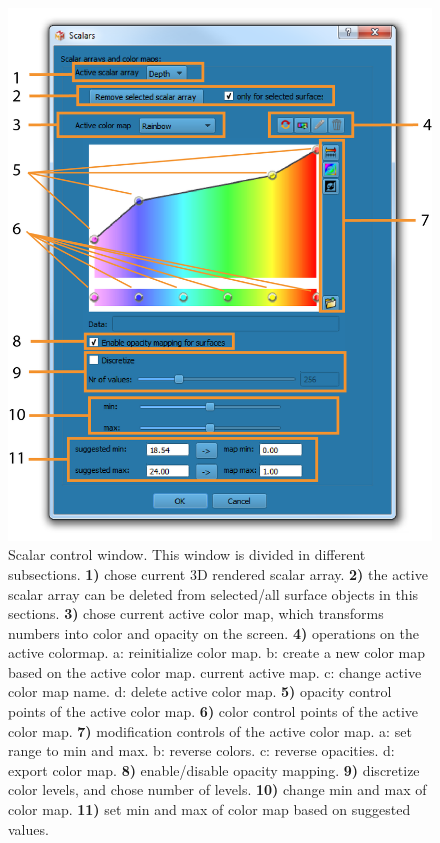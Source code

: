 \begin{figure}
  \centering
  \includegraphics[scale=1]{images/11/scalar_rendering_option_window2.png}
\caption{Scalar control window. This window is divided in different subsections. \textbf{1)} chose current 3D rendered scalar array.  \textbf{2)} the active scalar array can be deleted from selected/all surface objects in this sections. \textbf{3)} chose current active color map, which transforms numbers into color and opacity on the screen. \textbf{4)} operations on the active colormap. a: reinitialize color map. b: create a new color map based on the active color map. current active map. c: change active color map name. d: delete active color map. \textbf{5)} opacity control points of the active color map. \textbf{6)} color control points of the active color map. \textbf{7)} modification controls of the active color map. a: set range to min and max. b: reverse colors. c: reverse opacities. d: export color map. \textbf{8)} enable/disable opacity mapping. \textbf{9)} discretize color levels, and chose number of levels. \textbf{10)} change min and max of color map. \textbf{11)} set min and max of color map based on suggested values.}	
\label{scalar_rendering_options_window}
 \end{figure}


